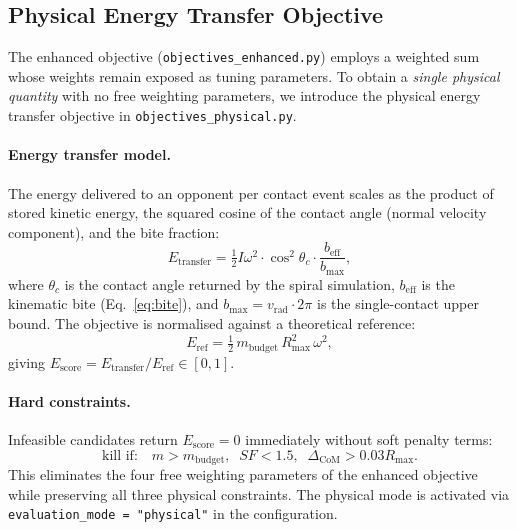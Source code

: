\documentclass[10pt,twocolumn]{article}
\begin{document}
\subsection{Physical Energy Transfer Objective}
\label{sec:physical_obj}

The enhanced objective (\texttt{objectives\_enhanced.py}) employs a weighted
sum whose weights remain exposed as tuning parameters.  To obtain a
\emph{single physical quantity} with no free weighting parameters, we introduce
the physical energy transfer objective in \texttt{objectives\_physical.py}.

\paragraph{Energy transfer model.}
The energy delivered to an opponent per contact event scales as the product
of stored kinetic energy, the squared cosine of the contact angle (normal
velocity component), and the bite fraction:
\begin{equation}
  E_{\mathrm{transfer}} = \tfrac{1}{2}I\omega^2 \cdot \cos^2\!\theta_c \cdot
    \frac{b_{\mathrm{eff}}}{b_{\mathrm{max}}},
  \label{eq:etransfer}
\end{equation}
where $\theta_c$ is the contact angle returned by the spiral simulation,
$b_{\mathrm{eff}}$ is the kinematic bite (Eq.~\ref{eq:bite}), and
$b_{\mathrm{max}} = v_{\mathrm{rad}} \cdot 2\pi$ is the single-contact
upper bound.  The objective is normalised against a theoretical reference:
\begin{equation}
  E_{\mathrm{ref}} = \tfrac{1}{2}\, m_{\mathrm{budget}}\, R_{\max}^2\, \omega^2,
  \label{eq:eref}
\end{equation}
giving $E_{\mathrm{score}} = E_{\mathrm{transfer}} / E_{\mathrm{ref}} \in [0,1]$.

\paragraph{Hard constraints.}
Infeasible candidates return $E_{\mathrm{score}} = 0$ immediately without
soft penalty terms:
\begin{equation}
  \text{kill if:} \quad
  m > m_{\mathrm{budget}}, \;\;
  \mathit{SF} < 1.5, \;\;
  \Delta_{\mathrm{CoM}} > 0.03 R_{\max}.
\end{equation}
This eliminates the four free weighting parameters of the enhanced objective
while preserving all three physical constraints.  The physical mode is
activated via \texttt{evaluation\_mode = "physical"} in the configuration.
\end{document}
